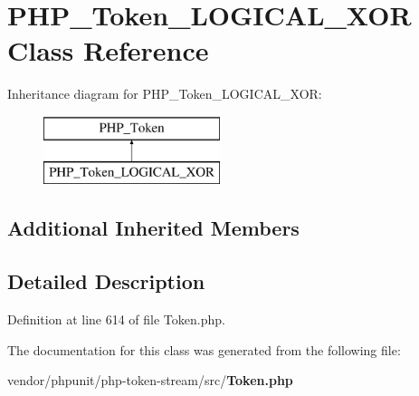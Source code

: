 \section{P\+H\+P\+\_\+\+Token\+\_\+\+L\+O\+G\+I\+C\+A\+L\+\_\+\+X\+O\+R Class Reference}
\label{class_p_h_p___token___l_o_g_i_c_a_l___x_o_r}
Inheritance diagram for P\+H\+P\+\_\+\+Token\+\_\+\+L\+O\+G\+I\+C\+A\+L\+\_\+\+X\+O\+R\+:\begin{figure}[H]
\begin{center}
\leavevmode
\includegraphics[height=2.000000cm]{class_p_h_p___token___l_o_g_i_c_a_l___x_o_r}
\end{center}
\end{figure}
\subsection*{Additional Inherited Members}


\subsection{Detailed Description}


Definition at line 614 of file Token.\+php.



The documentation for this class was generated from the following file\+:\begin{DoxyCompactItemize}
\item 
vendor/phpunit/php-\/token-\/stream/src/{\bf Token.\+php}\end{DoxyCompactItemize}

